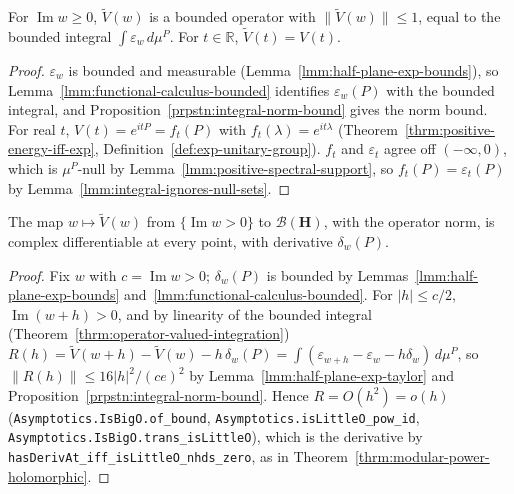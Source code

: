 \begin{lemma}
    \label{lmm:positive-energy-extension-operators}
    \leanok
    For $\operatorname{Im} w \ge 0$, $\widetilde{V}(w)$ is a bounded operator with $\|\widetilde{V}(w)\| \le 1$, equal to the bounded integral $\int \varepsilon_w \, d\mu^P$. For $t \in \mathbb{R}$, $\widetilde{V}(t) = V(t)$.
\end{lemma}
\begin{proof}
    \leanok
    $\varepsilon_w$ is bounded and measurable (Lemma~\ref{lmm:half-plane-exp-bounds}), so Lemma~\ref{lmm:functional-calculus-bounded} identifies $\varepsilon_w(P)$ with the bounded integral, and Proposition~\ref{prpstn:integral-norm-bound} gives the norm bound. For real $t$, $V(t) = e^{itP} = f_t(P)$ with $f_t(\lambda) = e^{it\lambda}$ (Theorem~\ref{thrm:positive-energy-iff-exp}, Definition~\ref{def:exp-unitary-group}). $f_t$ and $\varepsilon_t$ agree off $(-\infty, 0)$, which is $\mu^P$-null by Lemma~\ref{lmm:positive-spectral-support}, so $f_t(P) = \varepsilon_t(P)$ by Lemma~\ref{lmm:integral-ignores-null-sets}.
\end{proof}

\begin{lemma}
    \label{lmm:positive-energy-extension-holomorphic}
    \leanok
    The map $w \mapsto \widetilde{V}(w)$ from $\{\operatorname{Im} w > 0\}$ to $\mathcal{B}(\mathbf{H})$, with the operator norm, is complex differentiable at every point, with derivative $\delta_w(P)$.
\end{lemma}
\begin{proof}
    \leanok
    Fix $w$ with $c = \operatorname{Im} w > 0$; $\delta_w(P)$ is bounded by Lemmas~\ref{lmm:half-plane-exp-bounds} and~\ref{lmm:functional-calculus-bounded}. For $|h| \le c/2$, $\operatorname{Im}(w + h) > 0$, and by linearity of the bounded integral (Theorem~\ref{thrm:operator-valued-integration}) $R(h) = \widetilde{V}(w + h) - \widetilde{V}(w) - h\,\delta_w(P) = \int (\varepsilon_{w+h} - \varepsilon_w - h\delta_w) \, d\mu^P$, so $\|R(h)\| \le 16|h|^2/(ce)^2$ by Lemma~\ref{lmm:half-plane-exp-taylor} and Proposition~\ref{prpstn:integral-norm-bound}. Hence $R = O(h^2) = o(h)$ (\texttt{Asymptotics.IsBigO.of\_bound}, \texttt{Asymptotics.isLittleO\_pow\_id}, \texttt{Asymptotics.IsBigO.trans\_isLittleO}), which is the derivative by \texttt{hasDerivAt\_iff\_isLittleO\_nhds\_zero}, as in Theorem~\ref{thrm:modular-power-holomorphic}.
\end{proof}

